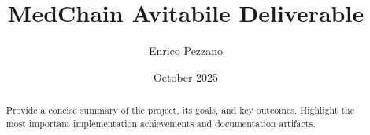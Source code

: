 \documentclass[11pt,a4paper]{article}
\title{MedChain Avitabile Deliverable}
\author{Enrico Pezzano}
\date{October 2025}
\begin{document}
\maketitle

\begin{abstract}
Provide a concise summary of the project, its goals, and key outcomes. Highlight the most important implementation achievements and documentation artifacts.
\end{abstract}

\tableofcontents
\newpage











\end{document}
